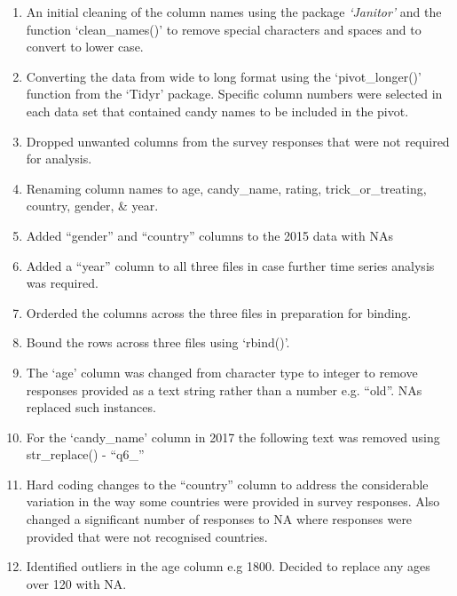\documentclass[]{article}
\providecommand{\tightlist}{%
  \setlength{\itemsep}{0pt}\setlength{\parskip}{0pt}}
\begin{document}
\begin{enumerate}
\def\labelenumi{\arabic{enumi}.}
\tightlist
\item
  An initial cleaning of the column names using the package
  \emph{`Janitor'} and the function `clean\_names()' to remove special
  characters and spaces and to convert to lower case.\\
\item
  Converting the data from wide to long format using the
  `pivot\_longer()' function from the `Tidyr' package. Specific column
  numbers were selected in each data set that contained candy names to
  be included in the pivot.\\
\item
  Dropped unwanted columns from the survey responses that were not
  required for analysis.\\
\item
  Renaming column names to age, candy\_name, rating,
  trick\_or\_treating, country, gender, \& year.\\
\item
  Added ``gender'' and ``country'' columns to the 2015 data with NAs
\item
  Added a ``year'' column to all three files in case further time series
  analysis was required.\\
\item
  Orderded the columns across the three files in preparation for
  binding.\\
\item
  Bound the rows across three files using `rbind()'.\\
\item
  The `age' column was changed from character type to integer to remove
  responses provided as a text string rather than a number e.g. ``old''.
  NAs replaced such instances.\\
\item
  For the `candy\_name' column in 2017 the following text was removed
  using str\_replace() - ``q6\_''
\item
  Hard coding changes to the ``country'' column to address the
  considerable variation in the way some countries were provided in
  survey responses. Also changed a significant number of responses to NA
  where responses were provided that were not recognised countries.\\
\item
  Identified outliers in the age column e.g 1800. Decided to replace any
  ages over 120 with NA.
\end{enumerate}
\end{document}
